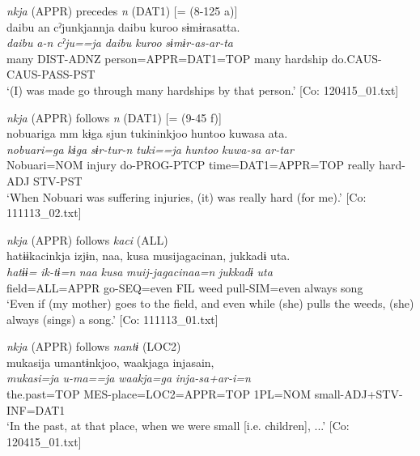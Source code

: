   \ex  \textit{nkja} (APPR) precedes \textit{n} (DAT1) [= (8-125 a)]\\
      \glll    {\textbar}daibu{\textbar}  an  cˀjunkjannja  {\textbar}daibu  kuroo{\textbar}  sɨmɨrasatta.\\
      \textit{daibu}  \textit{a-n}  \textit{cˀju==ja}  \textit{daibu}  \textit{kuroo} \textit{sɨmɨr-as-ar-ta}\\
      many  DIST-ADNZ  person=APPR=DAT1=TOP  many  hardship   do.CAUS-CAUS-PASS-PST\\
      \glt       ‘(I) was made go through many hardships by that person.’ [Co: 120415\_01.txt]

  \ex \textit{nkja} (APPR) follows \textit{n} (DAT1) [= (9-45 f)]\\
      \glll    nobuariga  mm  kɨga  sjun  tukininkjoo  huntoo  kuwasa  ata.\\
      \textit{nobuari=ga}    \textit{kɨga}  \textit{sɨr-tur-n}  \textit{tuki==ja}  \textit{huntoo}  \textit{kuwa-sa}  \textit{ar-tar}\\
      Nobuari=NOM    injury  do-PROG-PTCP  time=DAT1=APPR=TOP  really  hard-ADJ  STV-PST\\
      \glt       ‘When Nobuari was suffering injuries, (it) was really hard (for me).’ [Co: 111113\_02.txt]

   \ex  \textit{nkja} (APPR) follows \textit{kaci} (ALL)\\
      \glll    hatɨɨkacinkja  izjɨn,  naa,  kusa  musijagacinan,  jukkadɨ  uta.      \\
      \textit{hatɨɨ=}  \textit{ik-tɨ=n}  \textit{naa}  \textit{kusa}  \textit{muij-jagacinaa=n}  \textit{jukkadɨ}  \textit{uta}      \\
      field=ALL=APPR  go-SEQ=even  FIL  weed  pull-SIM=even  always  song\\
      \glt       ‘Even if (my mother) goes to the field, and even while (she) pulls the weeds, (she) always (sings) a song.’ [Co: 111113\_01.txt]

   \ex\textit{nkja} (APPR) follows \textit{nantɨ} (LOC2)\\
      \glll    mukasija  umantɨnkjoo,  waakjaga   injasain,\\
      \textit{mukasi=ja}  \textit{u-ma==ja}  \textit{waakja=ga}   \textit{inja-sa+ar-i=n}\\
      the.past=TOP  MES-place=LOC2=APPR=TOP  1PL=NOM  small-ADJ+STV-INF=DAT1\\
      \glt       ‘In the past, at that place, when we were small [i.e. children], ...’ [Co: 120415\_01.txt]
    \z
\z

